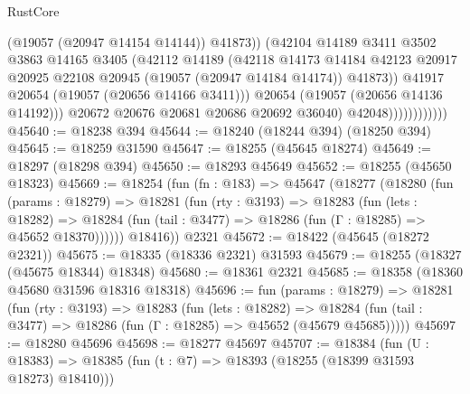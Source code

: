 \begin{lexlean}{RustCore}
\begin{coremodule}
                                    (@19057 (@20947 @14154 @14144))
                                    @41873))
                                (@42104
                                  @14189
                                  @3411
                                  @3502
                                  @3863
                                  @14165
                                  @3405
                                  (@42112
                                    @14189
                                    (@42118
                                      @14173
                                      @14184
                                      @42123
                                      @20917
                                      @20925
                                      @22108
                                      @20945
                                      (@19057 (@20947 @14184 @14174))
                                      @41873))
                                  @41917
                                  @20654
                                  (@19057 (@20656 @14166 @3411)))
                                @20654
                                (@19057 (@20656 @14136 @14192)))
                              @20672
                              @20676
                              @20681
                              @20686
                              @20692
                              @36040)
                            @42048))))))))))))
@45640 := @18238 @394
@45644 := @18240 (@18244 @394) (@18250 @394)
@45645 := @18259 @31590
@45647 := @18255 (@45645 @18274)
@45649 := @18297 (@18298 @394)
@45650 := @18293 @45649
@45652 := @18255 (@45650 @18323)
@45669 := @18254
    (fun (fn : @183) =>
    @45647
      (@18277
        (@18280
          (fun (params : @18279) =>
          @18281
            (fun (rty : @3193) =>
            @18283
              (fun (lets : @18282) =>
              @18284 (fun (tail : @3477) => @18286 (fun (Γ : @18285) => @45652 @18370))))))
        @18416))
    @2321
@45672 := @18422 (@45645 (@18272 @2321))
@45675 := @18335 (@18336 @2321) @31593
@45679 := @18255 (@18327 (@45675 @18344) @18348)
@45680 := @18361 @2321
@45685 := @18358 (@18360 @45680 @31596 @18316 @18318)
@45696 := fun (params : @18279) =>
  @18281
    (fun (rty : @3193) =>
    @18283
      (fun (lets : @18282) =>
      @18284 (fun (tail : @3477) => @18286 (fun (Γ : @18285) => @45652 (@45679 @45685)))))
@45697 := @18280 @45696
@45698 := @18277 @45697
@45707 := @18384
    (fun (U : @18383) => @18385 (fun (t : @7) => @18393 (@18255 (@18399 @31593 @18273) @18410)))

\end{coremodule}
\end{lexlean}
